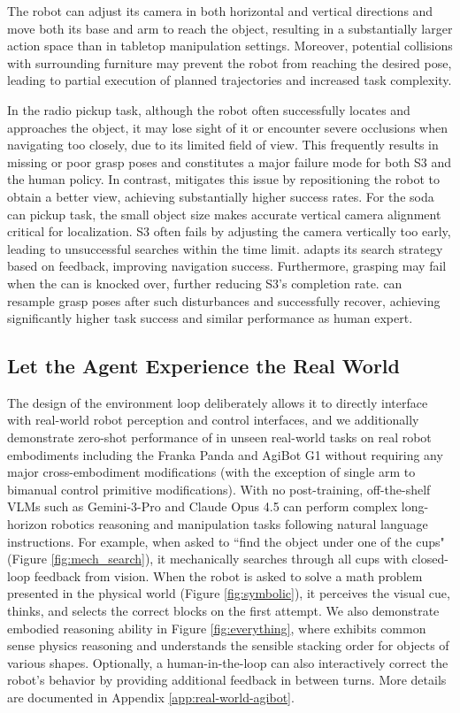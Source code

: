 The robot can adjust its camera in both horizontal and vertical directions and move both its base and arm to reach the object, resulting in a substantially larger action space than in tabletop manipulation settings. Moreover, potential collisions with surrounding furniture may prevent the robot from reaching the desired pose, leading to partial execution of planned trajectories and increased task complexity.

In the radio pickup task, although the robot often successfully locates and approaches the object, it may lose sight of it or encounter severe occlusions when navigating too closely, due to its limited field of view. This frequently results in missing or poor grasp poses and constitutes a major failure mode for both S3 and the human policy. In contrast, \sysname{} mitigates this issue by repositioning the robot to obtain a better view, achieving substantially higher success rates.
For the soda can pickup task, the small object size makes accurate vertical camera alignment critical for localization. S3 often fails by adjusting the camera vertically too early, leading to unsuccessful searches within the time limit. \sysname{} adapts its search strategy based on feedback, improving navigation success. Furthermore, grasping may fail when the can is knocked over, further reducing S3’s completion rate. \sysname{} can resample grasp poses after such disturbances and successfully recover, achieving significantly higher task success and similar performance as human expert.

\subsection{Let the Agent Experience the Real World}

The design of the \gymname{} environment loop deliberately allows it to directly interface with real-world robot perception and control interfaces, and we additionally demonstrate zero-shot performance of \sysname{} in unseen real-world tasks on real robot embodiments including the Franka Panda and AgiBot G1 without requiring any major cross-embodiment modifications (with the exception of single arm to bimanual control primitive modifications). With no post-training, off-the-shelf VLMs such as Gemini-3-Pro and Claude Opus 4.5 can perform complex long-horizon robotics reasoning and manipulation tasks following natural language instructions. For example, when asked to ``find the object under one of the cups" (Figure \ref{fig:mech_search}), it mechanically searches through all cups with closed-loop feedback from vision. When the robot is asked to solve a math problem presented in the physical world (Figure \ref{fig:symbolic}), it perceives the visual cue, thinks, and selects the correct blocks on the first attempt. We also demonstrate embodied reasoning ability in Figure \ref{fig:everything}, where \sysname{} exhibits common sense physics reasoning and understands the sensible stacking order for objects of various shapes. Optionally, a human-in-the-loop can also interactively correct the robot's behavior by providing additional feedback in between turns. More details are documented in Appendix \ref{app:real-world-agibot}.



